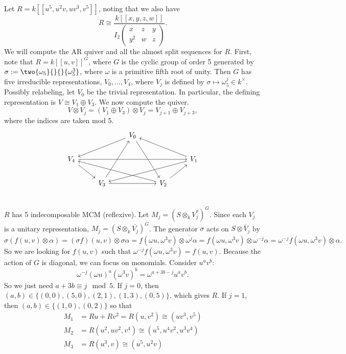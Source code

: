 \begin{ex}
Let $R= k[[u^5,u^2v,uv^3,v^5]]$, noting that we also have 
	\[
	R \cong \dfrac{k[[x,y,z,w]]}{I_2 \begin{pmatrix} x &  z & y \\ y^2 & w & z \end{pmatrix}}.
	\] 
We will compute the AR quiver and all the almost split sequences for $R$. First, note that $R= k[[u,v]]^G$, where $G$ is the cyclic group of order 5 generated by $\sigma:=\two{\omega_5}{}{}{\omega_5^3}$, where $\omega$ is a primitive fifth root of unity. Then $G$ has five irreducible representations, $V_0,\ldots,V_4$, where $V_j$ is defined by $\sigma \mapsto \omega_5^j \in k^\times$. Possibly relabeling, let $V_0$ be the trivial representation. In particular, the defining representation is $V \cong V_1 \oplus V_3$. We now compute the \mc quiver. 
	\[
	V \otimes V_j= (V_1 \oplus V_3) \otimes V_j= V_{j+1} \oplus V_{j+3}, 
	\]
where the indices are taken mod 5. 
	\[
	\begin{tikzcd}
	& & V_0 \arrow{dll} \arrow{ddr} & & \\
	V_4 \arrow{dr} \arrow{rrrr} & & & & V_1 \arrow{ull} \arrow{dlll} \\
	&V_3 \arrow{rr} \arrow{uur} & & V_2 \arrow{ulll} \arrow{ur} & \\	
	\end{tikzcd}
	\]
$R$ has 5 indecomposable MCM (reflexive). Let $M_j= (S \otimes_k V_j^*)^G$. Since each $V_j$ is a unitary representation, $M_j= (S \otimes_k \overline{V_j})^G$. The generator $\sigma$ acts on $S \otimes \overline{V}_j$ by
	\[
	\sigma(f(u,v) \otimes \alpha)= (\sigma f)(u,v) \otimes \sigma \alpha = f(\omega u, \omega^3 v) \otimes \overline{\omega^j} \alpha= f(\omega u,\omega^3 v) \otimes \omega^{-j} \alpha= \omega^{-j} f(\omega u, \omega^3 v) \otimes \alpha.
	\]
So we are looking for $f(u,v)$ such that $\omega^{-j} f(\omega u, \omega^3 v)= f(u,v)$. Because the action of $G$ is diagonal, we can focus on monomials. Consider $u^av^b$: 
	\[
	\omega^{-j} (\omega u)^a (\omega^3 v)^b= \omega^{a+3b-j} u^a v^b.
	\]
So we just need $a+3b \equiv j \mod 5$. If $j=0$, then $(a,b) \in \{ (0,0), (5,0),(2,1),(1,3),(0,5) \}$, which gives $R$. If $j=1$, then $(a,b) \in \{ (1,0), (0,2) \}$ so that 
	\[
	\begin{split}
	M_1&= Ru + Rv^2= R(u,v^2) \cong (uv^3,v^5) \\
	M_2&= R(u^2,uv^2,v^4) \cong (u^5,u^4v^2,u^3v^4) \\
	M_3&= R(u^3,v) \cong (u^5,u^2v) \\

\end{split}\]
\end{ex}
